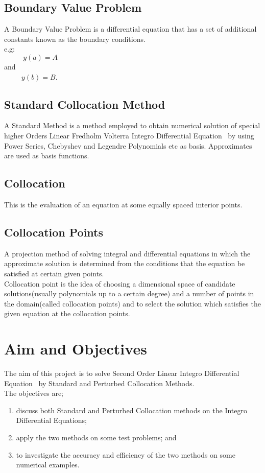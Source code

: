\documentclass[12pt]{report}
\newcommand{\IDE}{Integro Differential Equation}
\newcommand{\IDEs}{Integro Differential Equations}
\newcommand{\NI}{\noindent}
\begin{document}
	\subsection{Boundary Value Problem}
	A Boundary Value Problem is a differential equation that has a set of additional constants known as the boundary conditions.\\
	e.g:\\ 
	$\left.\right.~~~~~~~~~~~~y(a) = A$ \\
	and \\
	$\left.\right.~~~~~~~~~~~y(b) = B$.
	
	\subsection{Standard Collocation Method}
	A Standard Method is a method employed to obtain numerical solution of special higher Orders Linear Fredholm Volterra \IDE~ by using Power Series, Chebyshev and Legendre Polynomials etc as basis. Approximates are used as basis functions.
	
	\subsection{Collocation}
	This is the evaluation of an equation at some equally spaced interior points.
	
	\subsection{Collocation Points}
	A projection method of solving integral and differential equations in which the approximate solution is determined from the conditions that the equation be satisfied at certain given points.\\
	
	\NI Collocation point is the idea of choosing a dimensional space of candidate solutions(usually polynomials up to a certain degree) and a number of points in the domain(called collocation points) and to select the solution which satisfies the given equation at the collocation points.
	
	\section{Aim and Objectives}
	The aim of this project is to solve Second Order Linear \IDE~ by Standard and Perturbed Collocation Methods.\\
	
	\NI The objectives are;
	\begin{enumerate}
		\item discuss both Standard and Perturbed Collocation methods on the \IDEs;
		
		\item apply the two methods on some test problems; and 
		
		\item to investigate the accuracy and efficiency of the two methods on some numerical examples.
	\end{enumerate}
\end{document}
